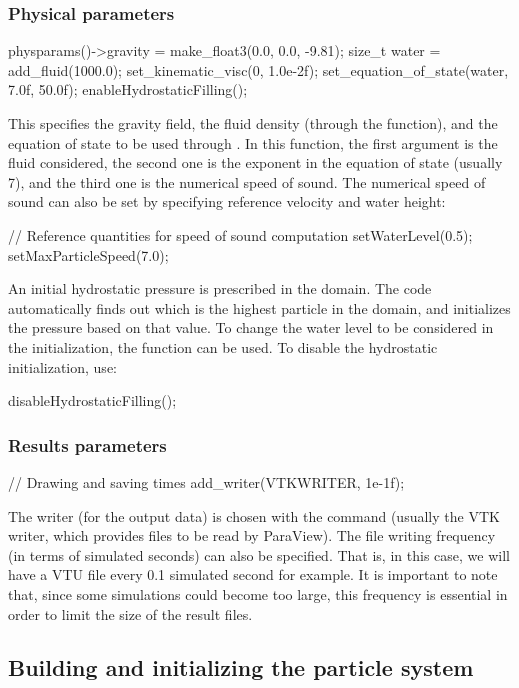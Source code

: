 \documentclass{../GPUSPHtemplate}
\begin{document}
\subsubsection{Physical parameters}
\begin{ccode}
physparams()->gravity = make_float3(0.0, 0.0, -9.81);
size_t water = add_fluid(1000.0);
set_kinematic_visc(0, 1.0e-2f);
set_equation_of_state(water, 7.0f, 50.0f);
enableHydrostaticFilling();
\end{ccode} 
This specifies the gravity field, the fluid density 
(through the  function),
and the equation of state to be used through .
In this function, the first argument is the fluid considered,
the second one is the exponent in the equation of state (usually 7),
and the third one is the numerical speed of sound.
The numerical speed of sound can also be set by specifying reference
velocity and water height:
\begin{ccode}
// Reference quantities for speed of sound computation
setWaterLevel(0.5);
setMaxParticleSpeed(7.0);
\end{ccode} 
An initial hydrostatic pressure is prescribed in the domain.
The code automatically finds out which is the highest
particle in the domain, and initializes the pressure based on that value.
To change the water level to be considered in the initialization, the function
 can be used. To disable the hydrostatic initialization, use:
\begin{ccode}
disableHydrostaticFilling();
\end{ccode} 

\subsubsection{Results parameters}
\begin{ccode}
  // Drawing and saving times
  add_writer(VTKWRITER, 1e-1f);
\end{ccode} 
The writer (for the output data) is chosen with the 
command (usually the VTK writer, which provides files to be read by ParaView).  
The file writing frequency (in terms of simulated seconds) can also be specified. 
That is, in this case, we will have a VTU file every 0.1 simulated second for example. 
It is important to note that, since some simulations could become 
too large, this frequency is essential in order to limit the size of the result files.\\


\subsection{Building and initializing the particle system}
\end{document}
